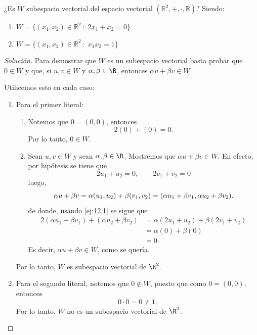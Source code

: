 \documentclass[a4,11pt]{aleph-notas}
\begin{document}
\begin{ejer}\label{ejer:12}
    ¿Es $W$ subespacio vectorial del espacio vectorial $(\mathbb{R}^2, + , \cdot, \mathbb{R})$? Siendo:
\begin{enumerate}
    \item $W = \{(x_1, x_2) \in \mathbb{R}^2 \,:\, \, 2x_1 + x_2 = 0\}$
    
    \item $W = \{(x_1, x_2) \in \mathbb{R}^2 \,:\, \, x_1x_2 = 1\}$
\end{enumerate}
\end{ejer}

\begin{proof}[Solución]\hspace{0pt}
    Para demostrar que $W$ es un subespacio vectorial basta probar que $0\in W$ y que, si $u,v\in W$ y $\alpha,\beta\in\R$, entonces $\alpha u+\beta v\in W$.

    Utilicemos esto en cada caso:
    \begin{enumerate}
        \item 
        Para el primer literal:
        \begin{enumerate}
            \item Notemos que $0 = (0,0)$, entonces
                \[
                    2 (0) + (0) = 0.
                \]
                Por lo tanto, $0\in W$.
                \item Sean $u,v\in W$ y sean $\alpha,\beta \in \R$. Mostremos que $\alpha u + \beta v \in W$. En efecto, por hipótesis se tiene que
                \begin{equation}\label{ej:12.1}
                    2 u_1 + u_2 = 0, \qquad 2 v_1 + v_2 = 0
                \end{equation}
                luego,
                \[
                    \alpha u + \beta v  = \alpha (u_1,u_2) + \beta (v_1,v_2) \\
                     = (\alpha u_1 + \beta v_1, \alpha u_2 + \beta v_2).
                \]
                de donde, usando \eqref{ej:12.1} se sigue que 
                \begin{align*}
                    2(\alpha u_1 + \beta v_1) + (\alpha u_2 + \beta v_2) 
                    &= \alpha( 2 u_1 + u_2) + \beta( 2 v_1 + v_2) \\
                    &= \alpha( 0 ) + \beta( 0 ) \\
                    &= 0.
                \end{align*}
                Es decir, $\alpha u + \beta v\in W$, como se quería.
        \end{enumerate}
        Por lo tanto, $W$ es subespacio vectorial de $\R^2$. 
    \item 
        Para el segundo literal, notemos que 
        $0 \notin W$,  puesto que como $0 = (0,0)$, entonces
        \[
            0\cdot 0 = 0 \neq 1.
        \]
        Por lo tanto, $W$ no es un subespacio vectorial de $\R^2$. \qedhere
    \end{enumerate}
\end{proof}
\end{document}
